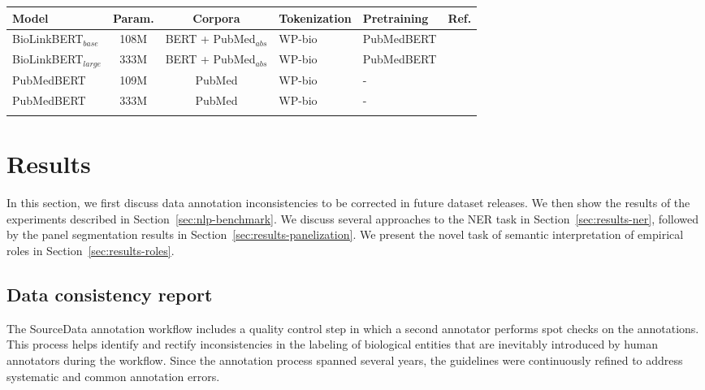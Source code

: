 \documentclass{bioinfo}
\begin{document}
\begin{methods}
\begin{table*}[]
 {\begin{tabular}{@{}lcclll@{}}\toprule \textbf{Model}              & \textbf{Param.}  & \textbf{Corpora}                                & \textbf{Tokenization}  & \textbf{Pretraining}         & \textbf{Ref.}\\\midrule
BioLinkBERT$_{base}$        & 108M                & BERT + PubMed$_{abs}$                           & WP-bio            & PubMedBERT                      & \cite{biolinkbert}\\
BioLinkBERT$_{large}$       & 333M                & BERT + PubMed$_{abs}$                           & WP-bio            & PubMedBERT                      & \cite{biolinkbert}\\
PubMedBERT     & 109M                & PubMed                                          & WP-bio            & -                               & \cite{pubmedbert}\\
PubMedBERT     & 333M                & PubMed                                          & WP-bio            & -                               & \cite{pubmedbert}\\\botrule
\end{tabular}}{}
\end{table*}

\end{methods}

\section{Results}

In this section, we first discuss data annotation inconsistencies to be corrected in future dataset releases. We then show the results of the experiments described in Section~\ref{sec:nlp-benchmark}. We discuss several approaches to the NER task in Section~\ref{sec:results-ner}, followed by the panel segmentation results in Section~\ref{sec:results-panelization}. We present the novel task of semantic interpretation of empirical roles in Section~\ref{sec:results-roles}.

\subsection{Data consistency report}\label{sec:data-consistency}

The SourceData annotation workflow includes a quality control step in which a second annotator performs spot checks on the annotations. This process helps identify and rectify inconsistencies in the labeling of biological entities that are inevitably introduced by human annotators during the workflow. Since the annotation process spanned several years, the guidelines were continuously refined to address systematic and common annotation errors.
\end{document}

